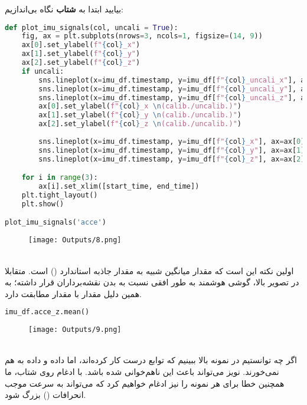\documentclass{article}
\begin{document}
بیایید ابتدا به \textbf{شتاب} نگاه بی‌اندازیم:
\begin{latin}
\begin{lstlisting}[language=Python]
def plot_imu_signals(col, uncali = True):
	fig, ax = plt.subplots(nrows=3, ncols=1, figsize=(14, 9))
	ax[0].set_ylabel(f"{col}_x")
	ax[1].set_ylabel(f"{col}_y")
	ax[2].set_ylabel(f"{col}_z")
	if uncali:
		sns.lineplot(x=imu_df.timestamp, y=imu_df[f"{col}_uncali_x"], ax=ax[0], label = 'uncali', color='orange')
		sns.lineplot(x=imu_df.timestamp, y=imu_df[f"{col}_uncali_y"], ax=ax[1], label = 'uncali', color='orange')
		sns.lineplot(x=imu_df.timestamp, y=imu_df[f"{col}_uncali_z"], ax=ax[2], label = 'uncali', color='orange')
		ax[0].set_ylabel(f"{col}_x \n(calib./uncalib.)")
		ax[1].set_ylabel(f"{col}_y \n(calib./uncalib.)")
		ax[2].set_ylabel(f"{col}_z \n(calib./uncalib.)")
		
		sns.lineplot(x=imu_df.timestamp, y=imu_df[f"{col}_x"], ax=ax[0], label='cali', color='cornflowerblue')
		sns.lineplot(x=imu_df.timestamp, y=imu_df[f"{col}_y"], ax=ax[1], label='cali', color='cornflowerblue')
		sns.lineplot(x=imu_df.timestamp, y=imu_df[f"{col}_z"], ax=ax[2], label='cali', color='cornflowerblue')

	for i in range(3):
		ax[i].set_xlim([start_time, end_time])
	plt.tight_layout()
	plt.show()

plot_imu_signals('acce')
\end{lstlisting}
\end{latin}
\begin{figure}[hbt!]
	\centering
	\texttt{[image: Outputs/8.png]}
\end{figure}
\ \\
اولین نکته این است که مقدار میانگین  شبیه به مقدار جاذبه استاندارد () است. متقابلا در تصویر بالا، گوشی هوشمند به طور افقی نسبت به بدن نقشه‌برداران قرار داشته؛ به همین دلیل مقدار  با مقدار  مطابقت دارد.
\begin{latin}
\begin{lstlisting}[language=Python]
imu_df.acce_z.mean()
\end{lstlisting}
\end{latin}
\begin{figure}[hbt!]
	\centering
	\texttt{[image: Outputs/9.png]}
\end{figure}
\ \\
اگر چه توانستیم در نمونه بالا ببینیم که توابع درست کار کرده‌اند، اما داده  و داده  به هم نمی‌خورند. نویز می‌تواند باعث این ناهم‌خوانی شده باشد. با ادغام روی شتاب، ما همچنین خطا برای هر نمونه را نیز ادغام خواهیم کرد که می‌تواند به سرعت موجب انحرافات () بزرگ شود.
\end{document}
